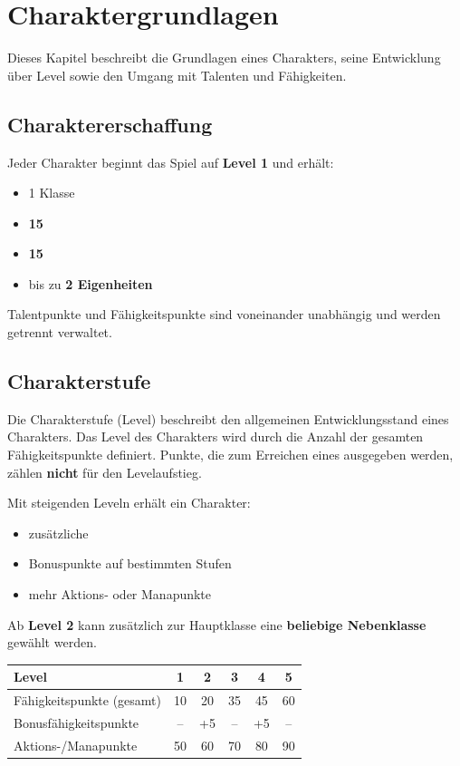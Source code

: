 \chapter{Charaktergrundlagen}

Dieses Kapitel beschreibt die Grundlagen eines Charakters, seine Entwicklung
über Level sowie den Umgang mit Talenten und Fähigkeiten.

\section{Charaktererschaffung}

Jeder Charakter beginnt das Spiel auf \textbf{Level 1} und erhält:

\begin{itemize}
	\item 1 Klasse
	\item \textbf{15 }
	\item \textbf{15 }
	\item bis zu \textbf{2 Eigenheiten}
\end{itemize}

Talentpunkte und Fähigkeitspunkte sind voneinander unabhängig
und werden getrennt verwaltet.

\section{Charakterstufe}

Die Charakterstufe (Level) beschreibt den allgemeinen Entwicklungsstand eines Charakters. Das Level des Charakters wird durch die Anzahl der gesamten Fähigkeitspunkte definiert. Punkte, die zum Erreichen eines \textbf{} ausgegeben werden, zählen \textbf{nicht} für den Levelaufstieg.

Mit steigenden Leveln erhält ein Charakter:
\begin{itemize}
	\item zusätzliche 
	\item Bonuspunkte auf bestimmten Stufen
	\item mehr Aktions- oder Manapunkte
\end{itemize}

Ab \textbf{Level 2} kann zusätzlich zur Hauptklasse eine \textbf{beliebige Nebenklasse}
gewählt werden.

\begin{center}
	\begin{tabular}{lccccc}
		\toprule
		\textbf{Level} & 1 & 2 & 3 & 4 & 5 \\
		\midrule
		Fähigkeitspunkte (gesamt) & 10 & 20 & 35 & 45 & 60 \\
		Bonusfähigkeitspunkte & -- & +5 & -- & +5 & -- \\
		Aktions-/Manapunkte & 50 & 60 & 70 & 80 & 90 \\
		\bottomrule
	\end{tabular}
\end{center}

